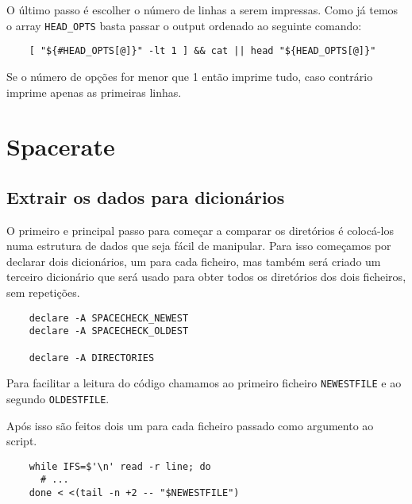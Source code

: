 {O último passo é escolher o número de linhas a serem impressas.
Como já temos o array \Verb|HEAD_OPTS| basta passar o output ordenado ao seguinte comando:

\begin{listing}[H]
	\centering
	\begin{verbatim}
    [ "${#HEAD_OPTS[@]}" -lt 1 ] && cat || head "${HEAD_OPTS[@]}"
  \end{verbatim}
\end{listing}

Se o número de opções for menor que 1 então imprime tudo, caso contrário imprime apenas as primeiras linhas.

\section{Spacerate}

\subsection{Extrair os dados para dicionários}

O primeiro e principal passo para começar a comparar os diretórios é colocá-los numa estrutura de dados que seja fácil de manipular.
Para isso começamos por declarar dois dicionários, um para cada ficheiro, mas também será criado um terceiro dicionário que será usado para obter todos os diretórios dos dois ficheiros, sem repetições.

\begin{listing}[H]
	\centering
	\begin{verbatim}
    declare -A SPACECHECK_NEWEST
    declare -A SPACECHECK_OLDEST

    declare -A DIRECTORIES
  \end{verbatim}
\end{listing}

Para facilitar a leitura do código chamamos ao primeiro ficheiro \Verb|NEWESTFILE| e ao segundo \Verb|OLDESTFILE|.

Após isso são feitos dois  um para cada ficheiro passado como argumento ao script.

\begin{listing}[H]
	\centering
	\begin{verbatim}
    while IFS=$'\n' read -r line; do
      # ...
    done < <(tail -n +2 -- "$NEWESTFILE")
  \end{verbatim}
\end{listing}

}
